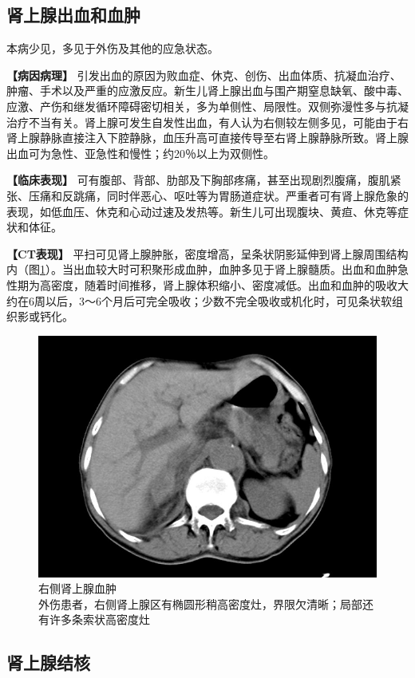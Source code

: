 \subsection{肾上腺出血和血肿}

本病少见，多见于外伤及其他的应急状态。

\textbf{【病因病理】}
引发出血的原因为败血症、休克、创伤、出血体质、抗凝血治疗、肿瘤、手术以及严重的应激反应。新生儿肾上腺出血与围产期窒息缺氧、酸中毒、应激、产伤和继发循环障碍密切相关，多为单侧性、局限性。双侧弥漫性多与抗凝治疗不当有关。肾上腺可发生自发性出血，有人认为右侧较左侧多见，可能由于右肾上腺静脉直接注入下腔静脉，血压升高可直接传导至右肾上腺静脉所致。肾上腺出血可为急性、亚急性和慢性；约20％以上为双侧性。

\textbf{【临床表现】}
可有腹部、背部、肋部及下胸部疼痛，甚至出现剧烈腹痛，腹肌紧张、压痛和反跳痛，同时伴恶心、呕吐等为胃肠道症状。严重者可有肾上腺危象的表现，如低血压、休克和心动过速及发热等。新生儿可出现腹块、黄疸、休克等症状和体征。

\textbf{【CT表现】}
平扫可见肾上腺肿胀，密度增高，呈条状阴影延伸到肾上腺周围结构内（图\ref{fig16-7}）。当出血较大时可积聚形成血肿，血肿多见于肾上腺髓质。出血和血肿急性期为高密度，随着时间推移，肾上腺体积缩小、密度减低。出血和血肿的吸收大约在6周以后，3～6个月后可完全吸收；少数不完全吸收或机化时，可见条状软组织影或钙化。

\begin{figure}[!htbp]
 \centering
 \includegraphics[width=.7\textwidth,height=\textheight,keepaspectratio]{./images/Image00351.jpg}
 \captionsetup{justification=centering}
 \caption{右侧肾上腺血肿\\{\small 外伤患者，右侧肾上腺区有椭圆形稍高密度灶，界限欠清晰；局部还有许多条索状高密度灶}}
 \label{fig16-7}
  \end{figure} 

\subsection{肾上腺结核}


